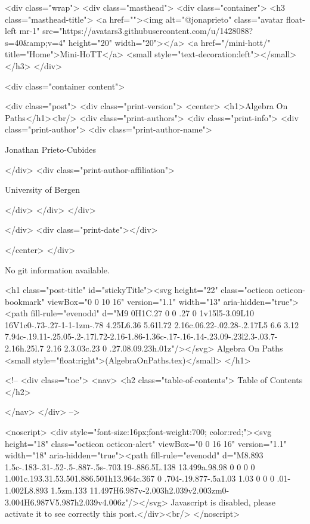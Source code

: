     <div class="wrap">
      <div class="masthead">
        <div class="container">
          <h3 class="masthead-title">
            <a href=""><img alt="@jonaprieto" class="avatar float-left mr-1" src="https://avatars3.githubusercontent.com/u/1428088?s=40&amp;v=4" height="20" width="20"></a>
            <a href="/mini-hott/" title="Home">Mini-HoTT</a>
            <small style="text-decoration:left"></small>
          </h3>
        </div>
      
      <div class="container content">
        







<div class="post">
  <div class="print-version">
    <center>
      <h1>Algebra On Paths</h1><br/>
        <div class="print-authors">
          <div class="print-info">
            <div class="print-author">
              <div class="print-author-name">
                
                  Jonathan Prieto-Cubides
                
              </div>
              <div class="print-author-affiliation">
                
                  University of Bergen
                
                </div>
            </div>
          </div>
          
          
        </div>
        <div class="print-date"></div>
        
        
    </center>
  </div>

  
  No git information available.
  

  <h1 class="post-title" id="stickyTitle"><svg height="22" class="octicon octicon-bookmark" viewBox="0 0 10 16" version="1.1" width="13" aria-hidden="true"><path fill-rule="evenodd" d="M9 0H1C.27 0 0 .27 0 1v15l5-3.09L10 16V1c0-.73-.27-1-1-1zm-.78 4.25L6.36 5.61l.72 2.16c.06.22-.02.28-.2.17L5 6.6 3.12 7.94c-.19.11-.25.05-.2-.17l.72-2.16-1.86-1.36c-.17-.16-.14-.23.09-.23l2.3-.03.7-2.16h.25l.7 2.16 2.3.03c.23 0 .27.08.09.23h.01z"/></svg> Algebra On Paths <small style="float:right">(AlgebraOnPaths.tex)</small>
  </h1>

  <!-- 
  <div class="toc">
    <nav>
    <h2 class="table-of-contents"> Table of Contents </h2>
      

    </nav>
  </div>
   -->

  <noscript>
  <div style="font-size:16px;font-weight:700; color:red;"><svg height="18" class="octicon octicon-alert" viewBox="0 0 16 16" version="1.1" width="18" aria-hidden="true"><path fill-rule="evenodd" d="M8.893 1.5c-.183-.31-.52-.5-.887-.5s-.703.19-.886.5L.138 13.499a.98.98 0 0 0 0 1.001c.193.31.53.501.886.501h13.964c.367 0 .704-.19.877-.5a1.03 1.03 0 0 0 .01-1.002L8.893 1.5zm.133 11.497H6.987v-2.003h2.039v2.003zm0-3.004H6.987V5.987h2.039v4.006z"/></svg> Javascript is disabled, please activate it to see correctly this post.</div><br/>
  </noscript>

